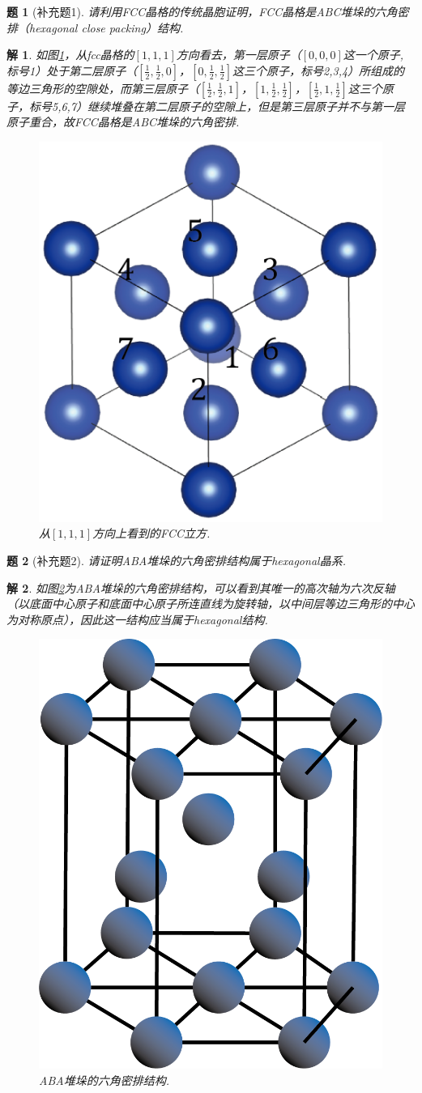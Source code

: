 \documentclass[UTF8,10pt,a4paper]{article}
\theoremstyle{Problem}
\newtheorem{prob}{题}
\theoremstyle{Solution}
\newtheorem*{sol}{解}
\begin{document}
\begin{prob}[补充题1]
    请利用FCC晶格的传统晶胞证明，FCC晶格是ABC堆垛的六角密排（hexagonal close packing）结构.
\end{prob}
\begin{sol}
    如图\ref{5-fcc-111}，从fcc晶格的$[1,1,1]$方向看去，第一层原子（$[0,0,0]$这一个原子,标号1）处于第二层原子（$[\frac{1}{2},\frac{1}{2},0]$，$[0,\frac{1}{2},\frac{1}{2}]$这三个原子，标号2,3,4）所组成的等边三角形的空隙处，而第三层原子（$[\frac{1}{2},\frac{1}{2},1]$，$[1,\frac{1}{2},\frac{1}{2}]$，$[\frac{1}{2},1,\frac{1}{2}]$这三个原子，标号5,6,7）继续堆叠在第二层原子的空隙上，但是第三层原子并不与第一层原子重合，故FCC晶格是ABC堆垛的六角密排.
    \begin{figure}[h]
        \centering
        \includegraphics[width=.32\textwidth]{5-fcc-111-2.png}
        \caption{从$[1,1,1]$方向上看到的FCC立方.}
        \label{5-fcc-111}
    \end{figure}
\end{sol}

\begin{prob}[补充题2]
    请证明ABA堆垛的六角密排结构属于hexagonal晶系.
\end{prob}
\begin{sol}
    如图\ref{6-aba-hexagonal}为ABA堆垛的六角密排结构，可以看到其唯一的高次轴为六次反轴（以底面中心原子和底面中心原子所连直线为旋转轴，以中间层等边三角形的中心为对称原点），因此这一结构应当属于hexagonal结构.
    \begin{figure}[h]
        \centering
        \includegraphics[width=.32\textwidth]{6-aba-hexagonal.png}
        \caption{ABA堆垛的六角密排结构.}
        \label{6-aba-hexagonal}
    \end{figure}
\end{sol}
\end{document}
